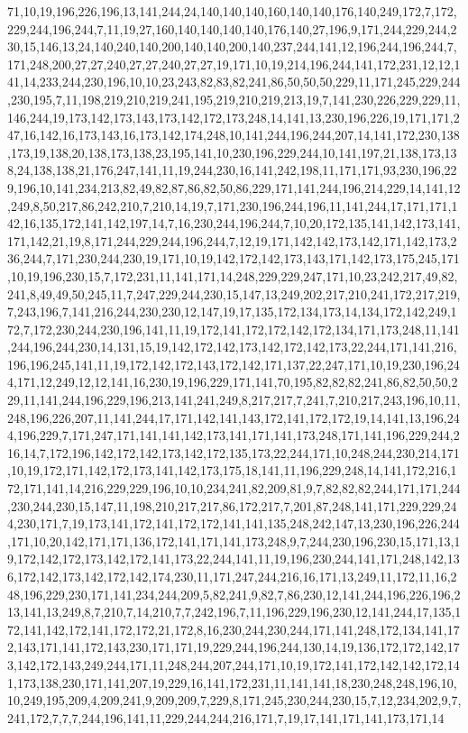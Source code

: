 71,10,19,196,226,196,13,141,244,24,140,140,140,160,140,140,176,140,249,172,7,172,229,244,196,244,7,11,19,27,160,140,140,140,140,176,140,27,196,9,171,244,229,244,230,15,146,13,24,140,240,140,200,140,140,200,140,237,244,141,12,196,244,196,244,7,171,248,200,27,27,240,27,27,240,27,27,19,171,10,19,214,196,244,141,172,231,12,12,141,14,233,244,230,196,10,10,23,243,82,83,82,241,86,50,50,50,229,11,171,245,229,244,230,195,7,11,198,219,210,219,241,195,219,210,219,213,19,7,141,230,226,229,229,11,146,244,19,173,142,173,143,173,142,172,173,248,14,141,13,230,196,226,19,171,171,247,16,142,16,173,143,16,173,142,174,248,10,141,244,196,244,207,14,141,172,230,138,173,19,138,20,138,173,138,23,195,141,10,230,196,229,244,10,141,197,21,138,173,138,24,138,138,21,176,247,141,11,19,244,230,16,141,242,198,11,171,171,93,230,196,229,196,10,141,234,213,82,49,82,87,86,82,50,86,229,171,141,244,196,214,229,14,141,12,249,8,50,217,86,242,210,7,210,14,19,7,171,230,196,244,196,11,141,244,17,171,171,142,16,135,172,141,142,197,14,7,16,230,244,196,244,7,10,20,172,135,141,142,173,141,171,142,21,19,8,171,244,229,244,196,244,7,12,19,171,142,142,173,142,171,142,173,236,244,7,171,230,244,230,19,171,10,19,142,172,142,173,143,171,142,173,175,245,171,10,19,196,230,15,7,172,231,11,141,171,14,248,229,229,247,171,10,23,242,217,49,82,241,8,49,49,50,245,11,7,247,229,244,230,15,147,13,249,202,217,210,241,172,217,219,7,243,196,7,141,216,244,230,230,12,147,19,17,135,172,134,173,14,134,172,142,249,172,7,172,230,244,230,196,141,11,19,172,141,172,172,142,172,134,171,173,248,11,141,244,196,244,230,14,131,15,19,142,172,142,173,142,172,142,173,22,244,171,141,216,196,196,245,141,11,19,172,142,172,143,172,142,171,137,22,247,171,10,19,230,196,244,171,12,249,12,12,141,16,230,19,196,229,171,141,70,195,82,82,82,241,86,82,50,50,229,11,141,244,196,229,196,213,141,241,249,8,217,217,7,241,7,210,217,243,196,10,11,248,196,226,207,11,141,244,17,171,142,141,143,172,141,172,172,19,14,141,13,196,244,196,229,7,171,247,171,141,141,142,173,141,171,141,173,248,171,141,196,229,244,216,14,7,172,196,142,172,142,173,142,172,135,173,22,244,171,10,248,244,230,214,171,10,19,172,171,142,172,173,141,142,173,175,18,141,11,196,229,248,14,141,172,216,172,171,141,14,216,229,229,196,10,10,234,241,82,209,81,9,7,82,82,82,244,171,171,244,230,244,230,15,147,11,198,210,217,217,86,172,217,7,201,87,248,141,171,229,229,244,230,171,7,19,173,141,172,141,172,172,141,141,135,248,242,147,13,230,196,226,244,171,10,20,142,171,171,136,172,141,171,141,173,248,9,7,244,230,196,230,15,171,13,19,172,142,172,173,142,172,141,173,22,244,141,11,19,196,230,244,141,171,248,142,136,172,142,173,142,172,142,174,230,11,171,247,244,216,16,171,13,249,11,172,11,16,248,196,229,230,171,141,234,244,209,5,82,241,9,82,7,86,230,12,141,244,196,226,196,213,141,13,249,8,7,210,7,14,210,7,7,242,196,7,11,196,229,196,230,12,141,244,17,135,172,141,142,172,141,172,172,21,172,8,16,230,244,230,244,171,141,248,172,134,141,172,143,171,141,172,143,230,171,171,19,229,244,196,244,130,14,19,136,172,172,142,173,142,172,143,249,244,171,11,248,244,207,244,171,10,19,172,141,172,142,142,172,141,173,138,230,171,141,207,19,229,16,141,172,231,11,141,141,18,230,248,248,196,10,10,249,195,209,4,209,241,9,209,209,7,229,8,171,245,230,244,230,15,7,12,234,202,9,7,241,172,7,7,7,244,196,141,11,229,244,244,216,171,7,19,17,141,171,141,173,171,14